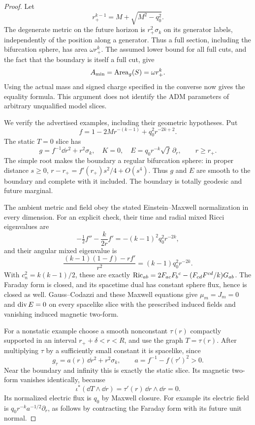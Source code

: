 \begin{proof}
Let
\[
 r_+^{k-1}=M+\sqrt{M^2-q_0^2}.
\]
The degenerate metric on the future horizon is $r_+^2\sigma_k$
on its generator labels, independently of the position along a
generator. Thus a full section, including the bifurcation sphere,
has area $\omega r_+^k$. The assumed lower bound for all full
cuts, and the fact that the boundary is itself a full cut, give
\[
 A_{\min}=\operatorname{Area}_g(S)=\omega r_+^k.
\]
Using the actual mass and signed charge specified in the converse
now gives the equality formula. This argument does not identify
the ADM parameters of arbitrary unqualified model slices.

We verify the advertised examples, including their geometric
hypotheses. Put
\[
 f=1-2Mr^{-(k-1)}+q_0^2r^{-2k+2}.
\]
The static $T=0$ slice has
\begin{equation}\label{rec:static-example}
 g=f^{-1}\dd r^2+r^2\sigma_k,\quad K=0,\quad
 E=q_0r^{-k}\sqrt f\,\partial_r,
 \qquad r\geq r_+.
\end{equation}
The simple root makes the boundary a regular bifurcation sphere:
in proper distance $s\geq0$,
$r-r_+=f'(r_+)s^2/4+O(s^4)$. Thus $g$ and $E$ are smooth
to the boundary and complete with it included. The boundary is
totally geodesic and future marginal.

The ambient metric and field obey the stated Einstein--Maxwell
normalization in every dimension. For an explicit check, their
time and radial mixed Ricci eigenvalues are
\[
 -\tfrac12f''-\frac{k}{2r}f'
        =-(k-1)^2q_0^2r^{-2k},
\]
and their angular mixed eigenvalue is
\[
 \frac{(k-1)(1-f)-rf'}{r^2}
        =(k-1)q_0^2r^{-2k}.
\]
With $c_n^2=k(k-1)/2$, these are exactly
$\operatorname{Ric}_{ab}=2F_{ac}F_b{}^c-(F_{cd}F^{cd}/k)G_{ab}$.
The Faraday form is closed, and its spacetime dual has constant
sphere flux, hence is closed as well. Gauss--Codazzi and these
Maxwell equations give $\mu_m=J_m=0$ and $\operatorname{div} E=0$ on every
spacelike slice with the prescribed induced fields and vanishing
induced magnetic two-form.

For a nonstatic example choose a smooth nonconstant
$\tau(r)$ compactly supported in an interval
$r_++\delta<r<R$, and use the graph $T=\tau(r)$. After multiplying
$\tau$ by a sufficiently small constant it is spacelike, since
\begin{equation}\label{rec:radial-graph}
 g_\tau=a(r)\,\dd r^2+r^2\sigma_k,
 \qquad a=f^{-1}-f(\tau')^2>0.
\end{equation}
Near the boundary and infinity this is exactly the static slice.
Its magnetic two-form vanishes identically, because
\[
 \iota^*(\dd T\wedge\dd r)
      =\tau'(r)\,\dd r\wedge\dd r=0.
\]
Its normalized electric flux is $q_0$ by Maxwell closure. For
example its electric field is
$q_0r^{-k}a^{-1/2}\partial_r$, as follows by contracting the
Faraday form with its future unit normal.


\end{proof}
